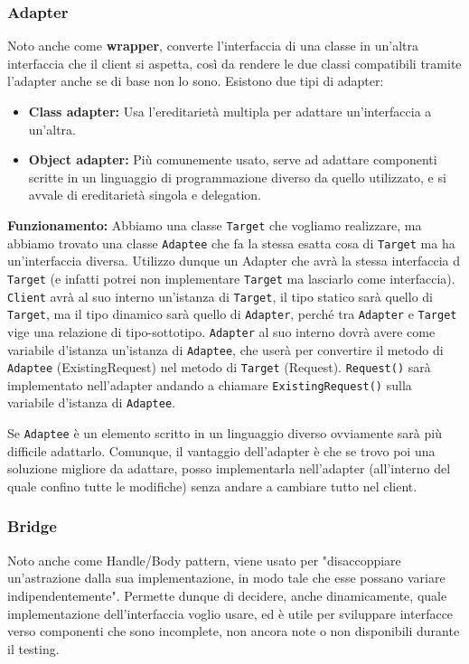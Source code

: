             \subsubsection{Adapter} Noto anche come \textbf{wrapper}, converte l'interfaccia di una classe in un'altra interfaccia che il client si aspetta, così da rendere le due classi compatibili tramite l'adapter anche se di base non lo sono. Esistono due tipi di adapter:
            \begin{itemize}
                \item \textbf{Class adapter:} Usa l'ereditarietà multipla per adattare un'interfaccia a un'altra.
                \item \textbf{Object adapter:} Più comunemente usato, serve ad adattare componenti scritte in un linguaggio di programmazione diverso da quello utilizzato, e si avvale di ereditarietà singola e delegation.
            \end{itemize}
            
            \textbf{Funzionamento:} Abbiamo una classe \texttt{Target} che vogliamo realizzare, ma abbiamo trovato una classe \texttt{Adaptee} che fa la stessa esatta cosa di \texttt{Target} ma ha un'interfaccia diversa. Utilizzo dunque un Adapter che avrà la stessa interfaccia d \texttt{Target} (e infatti potrei non implementare \texttt{Target} ma lasciarlo come interfaccia). \texttt{Client} avrà al suo interno un'istanza di \texttt{Target}, il tipo statico sarà quello di \texttt{Target}, ma il tipo dinamico sarà quello di \texttt{Adapter}, perché tra \texttt{Adapter} e \texttt{Target} vige una relazione di tipo-sottotipo. \texttt{Adapter} al suo interno dovrà avere come variabile d'istanza un'istanza di \texttt{Adaptee}, che userà per convertire il metodo di \texttt{Adaptee} (ExistingRequest) nel metodo di \texttt{Target} (Request). \texttt{Request()} sarà
            implementato nell’adapter andando a chiamare \texttt{ExistingRequest()} sulla variabile d’istanza di \texttt{Adaptee}.
            
            Se \texttt{Adaptee} è un elemento scritto in un linguaggio diverso ovviamente sarà più difficile adattarlo.
            Comunque, il vantaggio dell’adapter è che se trovo poi una soluzione migliore da adattare, posso implementarla nell’adapter (all’interno del quale confino tutte le modifiche) senza andare a cambiare tutto nel client.
            
            
            \subsubsection{Bridge} Noto anche come Handle/Body pattern, viene usato per "disaccoppiare un'astrazione dalla sua implementazione, in modo tale che esse possano variare indipendentemente". Permette dunque di decidere, anche dinamicamente, quale implementazione dell'interfaccia voglio usare, ed è utile per sviluppare interfacce verso componenti che sono incomplete, non ancora note o non disponibili durante il testing.
            
